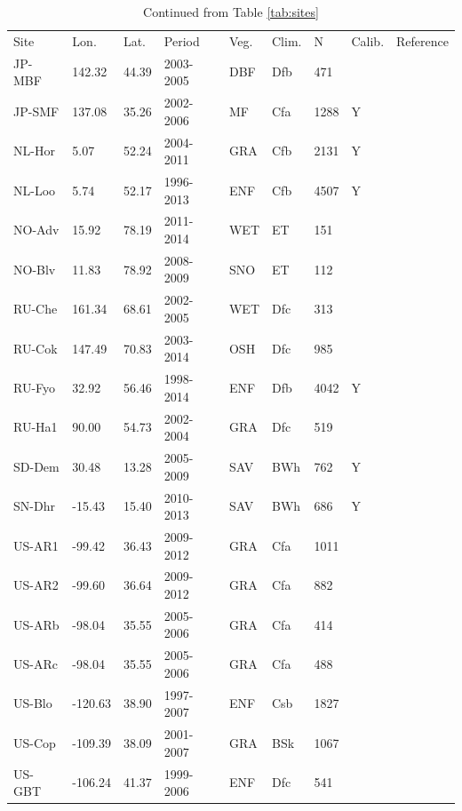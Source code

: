 \documentclass[gmd, manuscript]{copernicus}
\begin{document}
\begin{table}[t]
\caption{Continued from Table \ref{tab:sites}} 
\begin{tabular}{lllllllll}
  \tophline
  Site & Lon. & Lat. & Period & Veg. & Clim. & N & Calib. & Reference \\ 
  \middlehline  
  JP-MBF & 142.32 & 44.39 & 2003-2005 & DBF & Dfb & 471 &  & \citet{JP-MBF} \\ 
  JP-SMF & 137.08 & 35.26 & 2002-2006 & MF & Cfa & 1288 & Y & \citet{JP-SMF} \\ 
  NL-Hor & 5.07 & 52.24 & 2004-2011 & GRA & Cfb & 2131 & Y & \citet{NL-Hor} \\ 
  NL-Loo & 5.74 & 52.17 & 1996-2013 & ENF & Cfb & 4507 & Y & \citet{NL-Loo} \\ 
  NO-Adv & 15.92 & 78.19 & 2011-2014 & WET & ET & 151 &  & \citet{NO-Adv} \\ 
  NO-Blv & 11.83 & 78.92 & 2008-2009 & SNO & ET & 112 &  & \citet{NO-Blv} \\ 
  RU-Che & 161.34 & 68.61 & 2002-2005 & WET & Dfc & 313 &  & \citet{RU-Che} \\ 
  RU-Cok & 147.49 & 70.83 & 2003-2014 & OSH & Dfc & 985 &  & \citet{RU-Cok} \\ 
  RU-Fyo & 32.92 & 56.46 & 1998-2014 & ENF & Dfb & 4042 & Y & \citet{RU-Fyo} \\ 
  RU-Ha1 & 90.00 & 54.73 & 2002-2004 & GRA & Dfc & 519 &  & \citet{RU-Ha1} \\ 
  SD-Dem & 30.48 & 13.28 & 2005-2009 & SAV & BWh & 762 & Y & \citet{SD-Dem} \\ 
  SN-Dhr & -15.43 & 15.40 & 2010-2013 & SAV & BWh & 686 & Y & \citet{SN-Dhr} \\ 
  US-AR1 & -99.42 & 36.43 & 2009-2012 & GRA & Cfa & 1011 &  & \citet{US-AR1} \\ 
  US-AR2 & -99.60 & 36.64 & 2009-2012 & GRA & Cfa & 882 &  & \citet{US-AR2} \\ 
  US-ARb & -98.04 & 35.55 & 2005-2006 & GRA & Cfa & 414 &  & \citet{US-ARb} \\ 
  US-ARc & -98.04 & 35.55 & 2005-2006 & GRA & Cfa & 488 &  & \citet{US-ARc} \\ 
  US-Blo & -120.63 & 38.90 & 1997-2007 & ENF & Csb & 1827 &  & \citet{US-Blo} \\ 
  US-Cop & -109.39 & 38.09 & 2001-2007 & GRA & BSk & 1067 &  & \citet{US-Cop} \\ 
  US-GBT & -106.24 & 41.37 & 1999-2006 & ENF & Dfc & 541 &  & \citet{US-GBT} \\ 

\end{tabular}
\end{table}
\end{document}
